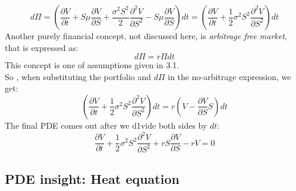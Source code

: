 \documentclass[a4paper]{report}
\begin{document}
\begin{itemize}
\begin{equation}
d\Pi = (\frac{\partial V}{\partial t}  + S\mu \frac{\partial V}{\partial S}  +    \frac{\sigma^2 S^2}{2}  \frac{\partial^2 V}{\partial S^2} - S\mu  \frac{\partial V}{\partial S}) dt = (\frac{\partial V}{\partial t}+\frac{1}{2}\sigma^2 S^2\frac{\partial^2 V}{\partial S^2})dt
\end{equation}
Another purely financial concept, not discussed here, is \textit{arbitrage free market}, that is expressed as: 
\begin{equation}
d\Pi=r\Pi dt
\end{equation}
This concept is one of assumptions given in 3.1.\\
So , when substituting the portfolio and $d\Pi$ in the no-arbitrage expression, we get:
\begin{equation}
(\frac{\partial V}{\partial t}+\frac{1}{2}\sigma^2 S^2\frac{\partial^2 V}{\partial S^2})dt = r(V-\frac{\partial V}{\partial S}S)dt
\end{equation}
The final PDE comes out after we d1vide both sides by $dt$:
\begin{equation}
\frac{\partial V}{\partial t}+\frac{1}{2} \sigma^2 S^2\frac{\partial^2 V}{\partial S^2} + rS\frac{\partial V}{\partial S} - rV=0
\end{equation}

\subsection{PDE insight: Heat equation}


\end{itemize}
\end{document}

